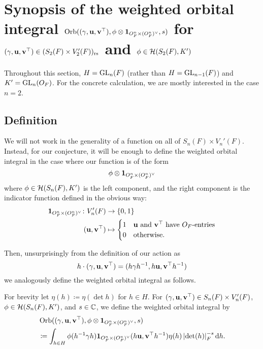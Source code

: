 \chapter{Synopsis of the weighted orbital integral
  $\operatorname{Orb}((\gamma, \mathbf u, \mathbf v^\top), \phi \otimes \mathbf{1}_{O_F^n \times (O_F^n)^\vee}, s)$
  for $(\gamma, \mathbf u, \mathbf v^\top) \in (S_2(F) \times V'_2(F))_{\mathrm{rs}}$
  and $\phi \in \mathcal H(S_2(F), K')$}
\label{ch:orbitalFJ0}

Throughout this section, $H = \operatorname{GL}_n(F)$ (rather than $H = \operatorname{GL}_{n-1}(F)$)
and $K' = \operatorname{GL}_n(O_F)$.
For the concrete calculation, we are mostly interested in the case $n = 2$.

\section{Definition}
We will not work in the generality of a function on all of $S_n(F) \times V_n'(F)$.
Instead, for our conjecture, it will be enough to define the weighted orbital integral
in the case where our function is of the form
\[ \phi \otimes \mathbf{1}_{O_F^n \times (O_F^n)^\vee} \]
where $\phi \in \mathcal H(S_n(F), K')$ is the left component, and
the right component is the indicator function defined in the obvious way:
\begin{align*}
  \mathbf{1}_{O_F^n \times (O_F^n)^\vee} \colon V'_n(F) &\to \{0,1\} \\
  (\mathbf u, \mathbf v^\top) &\mapsto
  \begin{cases}
    1 & \mathbf u \text{ and } \mathbf v^\top \text{ have } O_F \text{-entries} \\
    0 & \text{otherwise}.
  \end{cases}
\end{align*}

Then, unsurprisingly from the definition of our action as
\[ h \cdot {(\gamma, \mathbf u, \mathbf v^\top)} = (h\gamma h^{-1}, h\mathbf u, \mathbf v^\top h^{-1}) \]
we analogously define the weighted orbital integral as follows.
\begin{definition}
  For brevity let $\eta(h) \coloneqq \eta(\det h)$ for $h \in H$.
  For ${(\gamma, \mathbf u, \mathbf v^\top)} \in S_n(F) \times V'_n(F)$,
  $\phi \in \mathcal H(S_n(F), K')$, and $s \in \mathbb C$,
  we define the weighted orbital integral by
  \begin{align*}
    & \Orb((\gamma, \uu, \vv^\top), \phi \otimes \oneV, s) \\
    &\coloneqq \int_{h \in H} \phi(h\inv \gamma h) \oneV(h \uu, \vv^\top h^{-1})
    \eta(h) \left\lvert \det(h) \right\rvert_F^{-s} \odif h.
  \end{align*}
  \label{def:orbitalFJ}
\end{definition}


